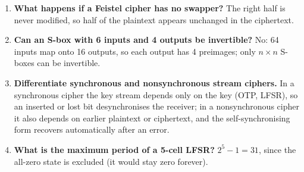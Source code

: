 \begin{enumerate}[leftmargin=1.5em,itemsep=2pt]
  \item \textbf{What happens if a Feistel cipher has no swapper?} The right half is never modified, so half of the plaintext appears unchanged in the ciphertext.
  \item \textbf{Can an S-box with 6 inputs and 4 outputs be invertible?} No: 64 inputs map onto 16 outputs, so each output has 4 preimages; only $n \times n$ S-boxes can be invertible.
  \item \textbf{Differentiate synchronous and nonsynchronous stream ciphers.} In a synchronous cipher the key stream depends only on the key (OTP, LFSR), so an inserted or lost bit desynchronises the receiver; in a nonsynchronous cipher it also depends on earlier plaintext or ciphertext, and the self-synchronising form recovers automatically after an error.
  \item \textbf{What is the maximum period of a 5-cell LFSR?} $2^5 - 1 = 31$, since the all-zero state is excluded (it would stay zero forever).
\end{enumerate}
